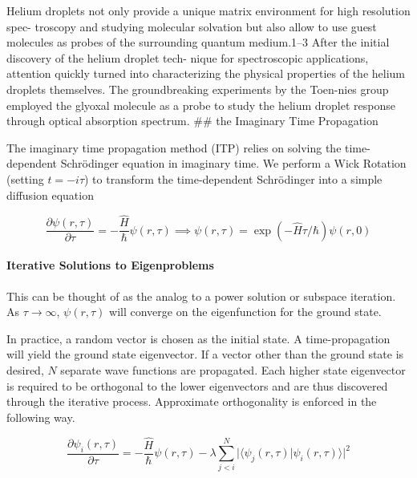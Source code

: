 \documentclass[12pt,]{book}
\let\oldparagraph\paragraph
\renewcommand{\paragraph}[1]{\oldparagraph{#1}\mbox{}}
\begin{document}
Helium droplets not only provide a unique matrix environment for high
resolution spec- troscopy and studying molecular solvation but also
allow to use guest molecules as probes of the surrounding quantum
medium.1--3 After the initial discovery of the helium droplet tech-
nique for spectroscopic applications, attention quickly turned into
characterizing the physical properties of the helium droplets
themselves. The groundbreaking experiments by the Toen-nies group
employed the glyoxal molecule as a probe to study the helium droplet
response through optical absorption spectrum. \#\# the Imaginary Time
Propagation

The imaginary time propagation method (ITP) relies on solving the
time-dependent Schrödinger equation in imaginary time. We perform a Wick
Rotation (setting \(t=-i\tau\)) to transform the time-dependent
Schrödinger into a simple diffusion equation

\begin{equation}
\label{eq:itpSch}
\frac{\partial \psi(r,\tau)}{\partial
\tau}=-\frac{\hat{H}}{\hbar}\psi(r,\tau) \implies \psi(r,\tau)=\exp(-\hat{H}\tau/\hbar)\psi(r,0)
\end{equation}

\paragraph{Iterative Solutions to Eigenproblems}

This can be thought of as the analog to a power solution or subspace
iteration. As \(\tau\to\infty\), \(\psi(r,\tau)\) will converge on the
eigenfunction for the ground state.

In practice, a random vector is chosen as the initial state. A
time-propagation will yield the ground state eigenvector. If a vector
other than the ground state is desired, \(N\) separate wave functions
are propagated. Each higher state eigenvector is required to be
orthogonal to the lower eigenvectors and are thus discovered through the
iterative process. Approximate orthogonality is enforced in the
following way.

\begin{equation}
\label{eq:appxOrth}
\frac{\partial\psi_i(r,\tau)}{\partial\tau} = -\frac{\hat{H}}{\hbar}\psi(r,\tau)-\lambda\sum_{j < i}^N \rvert\langle \psi_j(r,\tau)\rvert\psi_i(r,\tau)\rangle\rvert^2
\end{equation}

\paragraph{}
\end{document}
